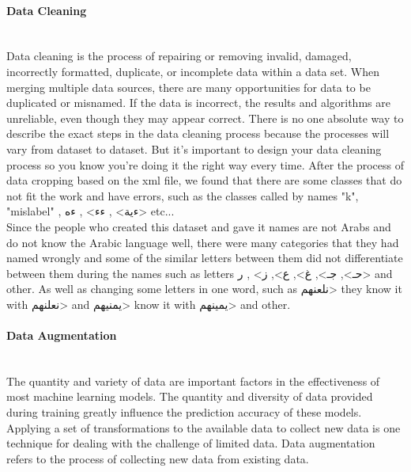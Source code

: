 \paragraph{Data Cleaning}\mbox{}\\
Data cleaning is the process of repairing or removing invalid, damaged, incorrectly formatted, duplicate, or incomplete data within a data set. When merging multiple data sources, there are many opportunities for data to be duplicated or misnamed. If the data is incorrect, the results and algorithms are unreliable, even though they may appear correct. There is no one absolute way to describe the exact steps in the data cleaning process because the processes will vary from dataset to dataset. But it's important to design your data cleaning process so you know you're doing it the right way every time.
After the process of data cropping based on the xml file, we found that there are some classes that do not fit the work and have errors, such as the classes called by names "k", "mislabel" , \<ءية> , \<ءء> , \<ءه> etc...\\
Since the people who created this dataset and gave it names are not Arabs and do not know the Arabic language well, there were many categories that they had named wrongly and some of the similar letters between them did not differentiate between them during the names such as letters \<حـ>, \<جـ>, \<غ>, \<ع>, \<ز> , \<ر> and other.
As well as changing some letters in one word, such as \<نلعنهم> they know it with \<نعلنهم> and \<يمنيهم> know it with \<يمينهم> and other.

\paragraph{Data Augmentation}\mbox{}\\

The quantity and variety of data are important factors in the effectiveness of most machine learning models. The quantity and diversity of data provided during training greatly influence the prediction accuracy of these models.
Applying a set of transformations to the available data to collect new data is one technique for dealing with the challenge of limited data. Data augmentation refers to the process of collecting new data from existing data.\\

